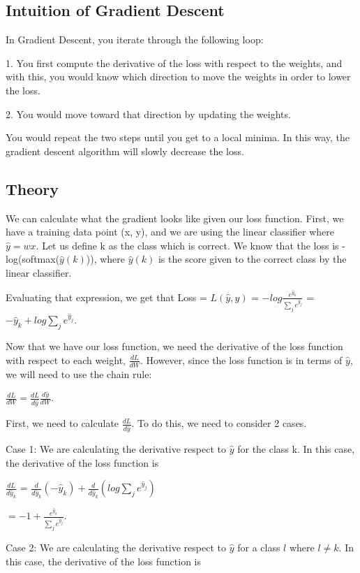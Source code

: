 \documentclass{article}
\begin{document}
\subsection{Intuition of Gradient Descent}

In Gradient Descent, you iterate through the following loop:

1. You first compute the derivative of the loss with respect to the weights, and with this, you would know which direction to move the weights in order to lower the loss.

2. You would move toward that direction by updating the weights.

You would repeat the two steps until you get to a local minima. In this way, the gradient descent algorithm will slowly decrease the loss.

\subsection{Theory}

We can calculate what the gradient looks like given our loss function. First, we have a training data point (x, y), and we are using the linear classifier where $\hat{y} = wx$. Let us define k as the class which is correct. We know that the loss is -log(softmax($\hat{y}(k)$)), where $\hat{y}(k)$ is the score given to the correct class by the linear classifier.

Evaluating that expression, we get that Loss = $L(\hat{y}, y)$ = $-log\frac{e^{\hat{y}_k}}{\sum_{j}e^{\hat{y}_j}}$ = $-\hat{y}_k + log\sum_j e^{\hat{y}_j}$. 

Now that we have our loss function, we need the derivative of the loss function with respect to each weight, $\frac{dL}{dW}$. However, since the loss function is in terms of $\hat{y}$, we will need to use the chain rule:

$\frac{dL}{dW} = \frac{dL}{d\hat{y}} \frac{d\hat{y}}{dW}$.

First, we need to calculate $\frac{dL}{d\hat{y}}$. To do this, we need to consider 2 cases.

Case 1: We are calculating the derivative respect to $\hat{y}$ for the class k. In this case, the derivative of the loss function is

$\frac{dL}{d\hat{y}_k}$ = $\frac{d}{d\hat{y}_k}(-\hat{y}_k) + \frac{d}{d\hat{y}_k}(log\sum_j e^{\hat{y}_j})$

$ = -1 + \frac{e^{\hat{y}_k}}{\sum_j e^{\hat{y}_j}}$.

Case 2: We are calculating the derivative respect to $\hat{y}$ for a class $l$ where $l \neq k$. In this case, the derivative of the loss function is
\end{document}
